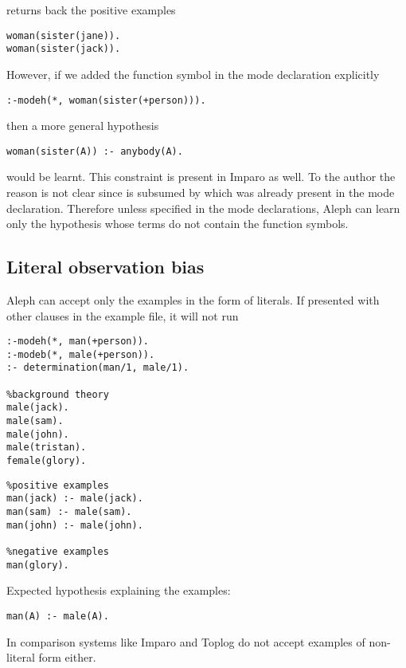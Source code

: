 returns back the positive examples
\begin{lstlisting}
woman(sister(jane)).
woman(sister(jack)).
\end{lstlisting}

However, if we added the  function symbol in the mode declaration explicitly
\begin{lstlisting}
:-modeh(*, woman(sister(+person))).
\end{lstlisting}
then a more general hypothesis
\begin{lstlisting}
woman(sister(A)) :- anybody(A).
\end{lstlisting}
would be learnt. This constraint is present in Imparo as well. To the author the reason is not clear since  is subsumed by
 which was already present in the mode declaration. Therefore unless specified in the mode declarations, Aleph can learn only the hypothesis whose terms do not contain the function symbols.

\subsection{Literal observation bias}
Aleph can accept only the examples in the form of literals. If presented with other clauses in the example file, it will not run

\begin{minipage}[t]{.50\textwidth}
\begin{lstlisting}
:-modeh(*, man(+person)).
:-modeb(*, male(+person)).
:- determination(man/1, male/1).

%background theory
male(jack).
male(sam).
male(john).
male(tristan).
female(glory).
\end{lstlisting}
\end{minipage}
\begin{minipage}[t]{.20\textwidth}
\begin{lstlisting}
%positive examples
man(jack) :- male(jack).
man(sam) :- male(sam).
man(john) :- male(john).

%negative examples
man(glory).
\end{lstlisting}
\end{minipage}

Expected hypothesis explaining the examples:
\begin{lstlisting}
man(A) :- male(A).
\end{lstlisting}
In comparison systems like Imparo and Toplog do not accept examples of non-literal form either.

